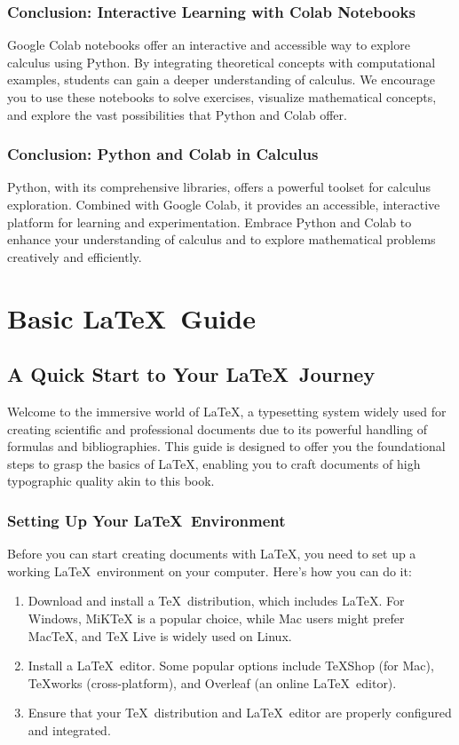 \documentclass[a4paper,12pt]{book}
\newcounter{problem}
\newcounter{example}
\begin{document}
\subsection*{Conclusion: Interactive Learning with Colab Notebooks}

Google Colab notebooks offer an interactive and accessible way to explore calculus using Python. By integrating theoretical concepts with computational examples, students can gain a deeper understanding of calculus. We encourage you to use these notebooks to solve exercises, visualize mathematical concepts, and explore the vast possibilities that Python and Colab offer.


\subsection*{Conclusion: Python and Colab in Calculus}

Python, with its comprehensive libraries, offers a powerful toolset for calculus exploration. Combined with Google Colab, it provides an accessible, interactive platform for learning and experimentation. Embrace Python and Colab to enhance your understanding of calculus and to explore mathematical problems creatively and efficiently.


\chapter{Basic \LaTeX\ Guide}
\section*{A Quick Start to Your \LaTeX\ Journey}

Welcome to the immersive world of \LaTeX, a typesetting system widely used for creating scientific and professional documents due to its powerful handling of formulas and bibliographies. This guide is designed to offer you the foundational steps to grasp the basics of \LaTeX, enabling you to craft documents of high typographic quality akin to this book.

\subsection*{Setting Up Your \LaTeX\ Environment}

Before you can start creating documents with \LaTeX, you need to set up a working \LaTeX\ environment on your computer. Here's how you can do it:

\begin{enumerate}
    \item Download and install a \TeX\ distribution, which includes \LaTeX. For Windows, MiKTeX is a popular choice, while Mac users might prefer MacTeX, and TeX Live is widely used on Linux.
    \item Install a \LaTeX\ editor. Some popular options include TeXShop (for Mac), TeXworks (cross-platform), and Overleaf (an online \LaTeX\ editor).
    \item Ensure that your \TeX\ distribution and \LaTeX\ editor are properly configured and integrated.
\end{enumerate}
\end{document}
